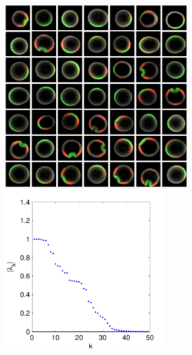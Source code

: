 \documentclass{pnastwo}
\begin{document}
\begin{figure}[t]
\includegraphics[width=8cm]{raw_data1}
\hfill
{}
\includegraphics[width=7cm]{FBsPCA_evals}


\end{figure}
\end{document}
